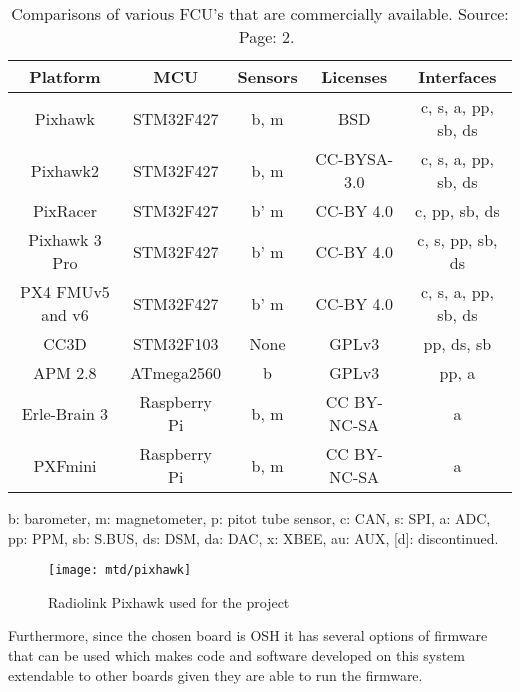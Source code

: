 \begin{table}[h!]
    \centering
    \begin{tabular}{|c | c | c | c | c|}
        \hline
        Platform & MCU & Sensors & Licenses & Interfaces\\
        \hline
        Pixhawk & STM32F427 & b, m & BSD & c, s, a, pp, sb, ds\\

        Pixhawk2 & STM32F427 & b, m & CC-BYSA-3.0 & c, s, a, pp, sb, ds\\

        PixRacer & STM32F427 & b' m & CC-BY 4.0 & c, pp, sb, ds \\

        Pixhawk 3 Pro & STM32F427 & b' m & CC-BY 4.0 & c, s, pp, sb, ds \\

        PX4 FMUv5 and v6 & STM32F427 & b' m & CC-BY 4.0 & c, s, a, pp, sb, ds \\

        CC3D & STM32F103 & None & GPLv3 & pp, ds, sb\\

        APM 2.8 & ATmega2560 & b & GPLv3 & pp, a\\

        Erle-Brain 3 & Raspberry Pi & b, m & CC BY-NC-SA &  a\\

        PXFmini & Raspberry Pi & b, m & CC BY-NC-SA & a\\
        \hline
    \end{tabular}
    \caption{Comparisons of various FCU's that are commercially available.
    Source: ~\citet{ebeid2018survey} Page: 2.}
    \label{tb:comparison}

b: barometer, m: magnetometer, p: pitot tube sensor, c: CAN, s: SPI, a: ADC, pp:
PPM, sb: S.BUS, ds: DSM, da: DAC, x: XBEE, au: AUX, [d]: discontinued.
\end{table}

\begin{figure}[ht!]
    \centering
    \texttt{[image: mtd/pixhawk]}
    \caption{Radiolink Pixhawk used for the project}
    \label{fig:pix}
\end{figure}

Furthermore, since the chosen board is OSH it has several options of firmware that can be used which makes code and software developed on this system extendable to other boards given they are able to run the firmware.
\newpage

